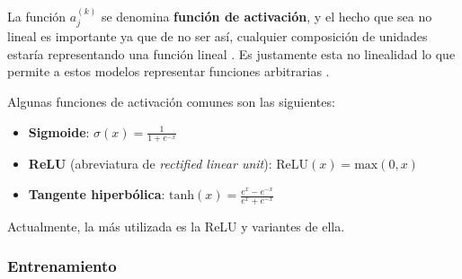 \documentclass[../../main.tex]{subfiles}
\begin{document}
La función \(a^{(k)}_j\) se denomina \textbf{función de activación}, y el hecho que sea no
lineal es importante ya que de no ser así, cualquier composición de unidades estaría
representando una función lineal \cite{ai-a-modern-approach}. Es justamente esta no
linealidad lo que permite a estos modelos representar funciones arbitrarias
\cite{ai-a-modern-approach}.

Algunas funciones de activación comunes son las siguientes:
\begin{itemize}
    \item \textbf{Sigmoide}: \(\sigma(x)=\frac{1}{1+e^{-x}}\)
    \item \textbf{ReLU} (abreviatura de \textit{rectified linear unit}):
    \(\text{ReLU}(x) = \text{max}(0, x)\)
    \item \textbf{Tangente hiperbólica}: \(\text{tanh}(x)=\frac{e^x - e^{-x}}{e^x + e^{-x}}\)
\end{itemize}
Actualmente, la más utilizada es la ReLU y variantes de ella.






\subsubsection{Entrenamiento}

\end{document}

